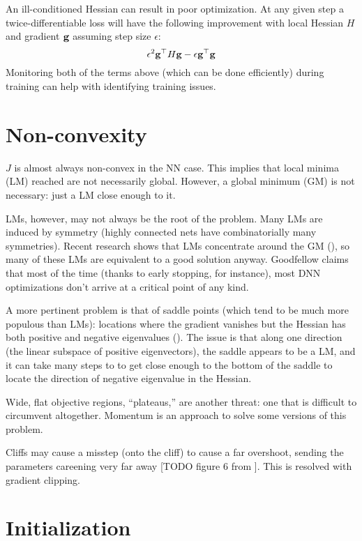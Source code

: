 \documentclass{article}
\begin{document}
An ill-conditioned Hessian can result in poor optimization. At any given step a twice-differentiable loss will have the following improvement with local Hessian $H$ and gradient $\textbf{g}$ assuming step size $\epsilon$:
$$
\epsilon^2 \textbf{g}^\top H\textbf{g}-\epsilon \textbf{g}^\top\textbf{g}
$$
Monitoring both of the terms above (which can be done efficiently) during training can help with identifying training issues.

\section{Non-convexity}

$J$ is almost always non-convex in the NN case. This implies that local minima (LM) reached are not necessarily global. However, a global minimum (GM) is not necessary: just a LM close enough to it.

LMs, however, may not always be the root of the problem. Many LMs are induced by symmetry (highly connected nets have combinatorially many symmetries). Recent research shows that LMs concentrate around the GM (), so many of these LMs are equivalent to a good solution anyway. Goodfellow claims that most of the time (thanks to early stopping, for instance), most DNN optimizations don't arrive at a critical point of any kind.

A more pertinent problem is that of saddle points (which tend to be much more populous than LMs): locations where the gradient vanishes but the Hessian has both positive and negative eigenvalues (). The issue is that along one direction (the linear subspace of positive eigenvectors), the saddle appears to be a LM, and it can take many steps to to get close enough to the bottom of the saddle to locate the direction of negative eigenvalue in the Hessian.

Wide, flat objective regions, ``plateaus,'' are another threat: one that is difficult to circumvent altogether. Momentum is an approach to solve some versions of this problem.

Cliffs may cause a misstep (onto the cliff) to cause a far overshoot, sending the parameters careening very far away [TODO figure 6 from ]. This is resolved with gradient clipping.

\section{Initialization}
\end{document}
